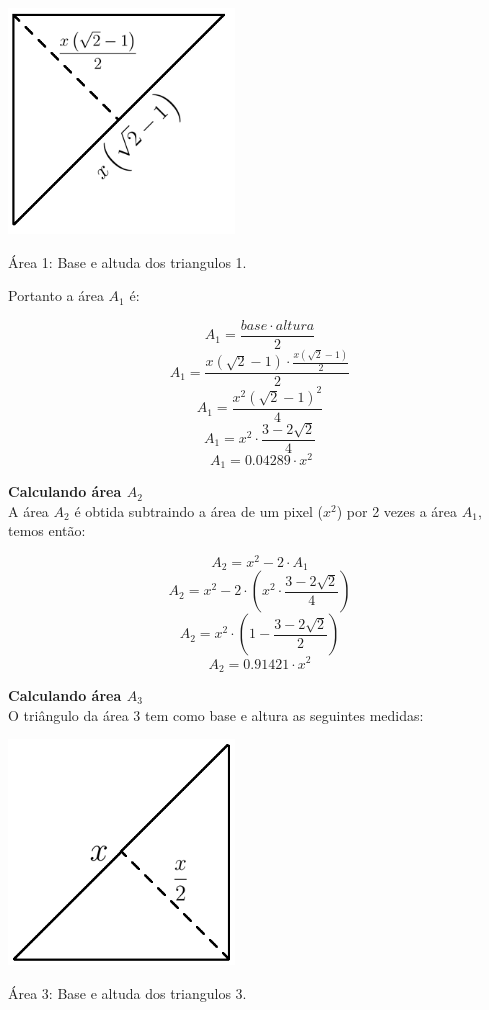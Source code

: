 \documentclass[a4paper, 12pt]{article}
\begin{document}
\begin{center}
    \includegraphics[width=6cm]{06_area_1.fw.png}
    
    Área 1: Base e altuda dos triangulos 1.
\end{center}

Portanto a área $A_1$ é:

$$A_1=\frac{base\cdot altura}{2}$$
$$A_1=\frac{x\left(\sqrt{2}-1\right)\cdot \frac{x\left(\sqrt{2}-1\right)}{2}}{2}$$
$$A_1=\frac{x^2\left(\sqrt{2}-1\right)^2}{4}$$
$$A_1=x^2\cdot \frac{3-2\sqrt{2}}{4}$$
$$\boxed{\ \ A_1=0.04289\cdot x^2\ }$$

\textbf{Calculando área $A_2$}\\

A área $A_2$ é obtida subtraindo a área de um pixel ($x^2$) por 2 vezes a área $A_1$, temos então:

$$A_2=x^2-2\cdot A_1$$
$$A_2=x^2-2\cdot \left(x^2\cdot \frac{3-2\sqrt{2}}{4}\right)$$
$$A_2=x^2\cdot \left(1-\frac{3-2\sqrt{2}}{2}\right)$$
$$\boxed{\ \ A_2=0.91421\cdot x^2\ \ }$$

\textbf{Calculando área $A_3$}\\

O triângulo da área 3 tem como base e altura as seguintes medidas:

\begin{center}
    \includegraphics[width=6cm]{07_area_3.fw.png}
    
    Área 3: Base e altuda dos triangulos 3.
\end{center}
\end{document}
